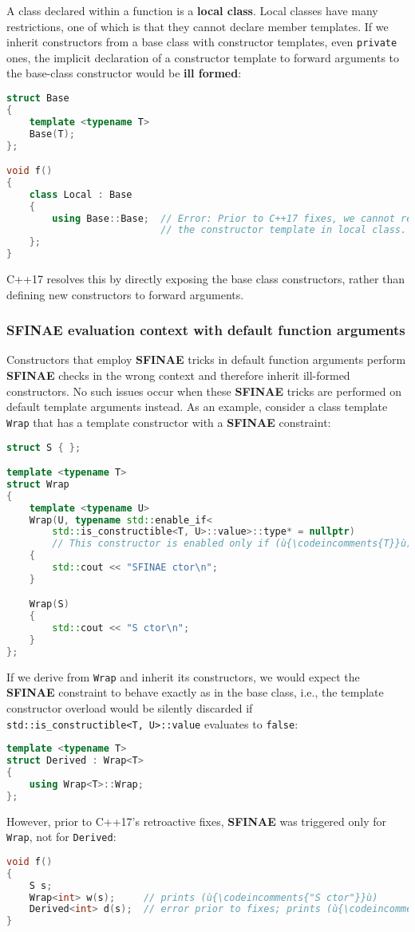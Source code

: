 A class declared within a function is a \textbf{local class}. Local classes have many restrictions, one of which is that they cannot declare member templates. If we inherit constructors from a base class with constructor templates, even \texttt{private} ones, the implicit declaration of a constructor template to forward arguments to the base-class constructor would be \textbf{ill formed}:
\begin{lstlisting}[language=C++]
struct Base
{
    template <typename T>
    Base(T);
};

void f()
{
    class Local : Base
    {
        using Base::Base;  // Error: Prior to C++17 fixes, we cannot redeclare
                           // the constructor template in local class.
    };
}
\end{lstlisting}
    C++17 resolves this by directly exposing the base class constructors, rather than defining new constructors to forward arguments.
    
\subsubsection[SFINAE evaluation context with default function arguments]{SFINAE evaluation context with default function arguments}

Constructors that employ \textbf{SFINAE} tricks in default function arguments perform \mbox{\textbf{SFINAE}} checks in the wrong context and therefore inherit ill-formed constructors. No such issues occur when these \textbf{SFINAE} tricks are performed on default template arguments instead. As an example, consider a class template \texttt{Wrap} that has a template constructor with a \textbf{SFINAE} constraint:
\begin{lstlisting}[language=C++]
struct S { };

template <typename T>
struct Wrap
{
    template <typename U>
    Wrap(U, typename std::enable_if<
        std::is_constructible<T, U>::value>::type* = nullptr)
        // This constructor is enabled only if (ù{\codeincomments{T}}ù) is constructible from (ù{\codeincomments{U}}ù).
    {
        std::cout << "SFINAE ctor\n";
    }

    Wrap(S)
    {
        std::cout << "S ctor\n";
    }
};
\end{lstlisting}
    If we derive from \texttt{Wrap} and inherit its constructors, we would expect the \textbf{SFINAE} constraint to behave exactly as in the base class, i.e., the template constructor overload would be silently discarded if \texttt{std::is\_constructible<T,}~\texttt{U>::value} evaluates to \texttt{false}:
\begin{lstlisting}[language=C++]
template <typename T>
struct Derived : Wrap<T>
{
    using Wrap<T>::Wrap;
};
\end{lstlisting}
    However, prior to C++17’s retroactive fixes, \textbf{SFINAE} was triggered only for \texttt{Wrap}, not for \texttt{Derived}:
\begin{lstlisting}[language=C++]
void f()
{
    S s;
    Wrap<int> w(s);     // prints (ù{\codeincomments{"S ctor"}}ù)
    Derived<int> d(s);  // error prior to fixes; prints (ù{\codeincomments{"S ctor"}}ù) afterward
}
\end{lstlisting}
    
